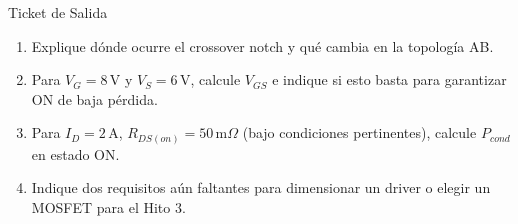 \documentclass[aspectratio=169, table]{beamer}
\begin{document}
\begin{frame}{Ticket de Salida}
    \begin{enumerate}
        \item Explique dónde ocurre el crossover notch y qué cambia en la topología AB.
        \item Para $V_G = 8\,\text{V}$ y $V_S = 6\,\text{V}$, calcule $V_{GS}$ e indique si esto basta para garantizar ON de baja pérdida.
        \item Para $I_D = 2\,\text{A}$, $R_{DS(on)} = 50\,\text{m}\Omega$ (bajo condiciones pertinentes), calcule $P_{cond}$ en estado ON.
        \item Indique dos requisitos aún faltantes para dimensionar un driver o elegir un MOSFET para el Hito 3.
    \end{enumerate}
\end{frame}
\end{document}
